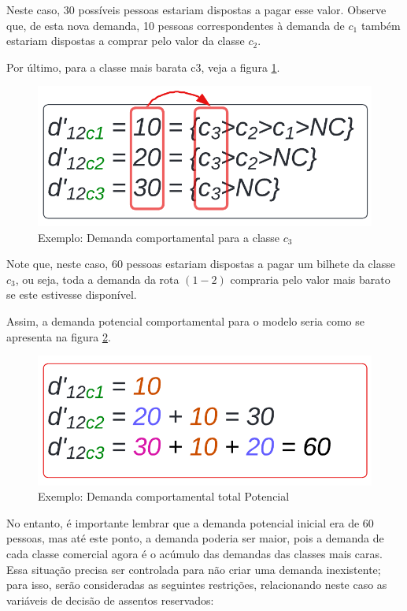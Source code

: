 Neste caso, 30 possíveis pessoas estariam dispostas a pagar esse valor. Observe que, de esta nova demanda, 10 pessoas correspondentes à demanda de $c_1$ também estariam dispostas a comprar pelo valor da classe $c_2$.

Por último, para a classe mais barata c3, veja a figura \ref{fig: exemplo_dem_c3}.
\begin{figure}[H]
	\begin{center}
		\includegraphics[scale=0.24]{img/dem_compo_c3.png}
		\caption{Exemplo: Demanda comportamental para a classe $c_3$}
		\label{fig: exemplo_dem_c3}
	\end{center}
\end{figure}
Note que, neste caso, 60 pessoas estariam dispostas a pagar um bilhete da classe $c_3$, ou seja, toda a demanda da rota $(1-2)$ compraria pelo valor mais barato se este estivesse disponível.

Assim, a demanda potencial comportamental para o modelo seria como se apresenta na figura \ref{fig: exemplo_dem_poten}.
\begin{figure}[H]
	\begin{center}
		\includegraphics[scale=0.24]{img/dem_compo_poten.png}
		\caption{Exemplo: Demanda comportamental total Potencial}
		\label{fig: exemplo_dem_poten}
	\end{center}
\end{figure}
No entanto, é importante lembrar que a demanda potencial inicial era de 60 pessoas, mas até este ponto, a demanda poderia ser maior, pois a demanda de cada classe comercial agora é o acúmulo das demandas das classes mais caras. Essa situação precisa ser controlada para não criar uma demanda inexistente; para isso, serão consideradas as seguintes restrições, relacionando neste caso as variáveis de decisão de assentos reservados:

